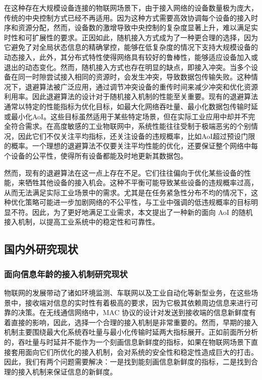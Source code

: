 在这种存在大规模设备连接的物联网场景下，由于接入网络的设备数量极为庞大，传统的中央控制方式已经不再适用\cite{9}。因为这种方式需要高效协调每个设备的接入时序和资源分配，然而，设备数的激增导致中央控制的复杂度显著上升，难以满足实时性和可扩展性的要求\cite{berioli2016modern}。正因如此，随机接入方式成为了一种更合理的选择，因为它避免了对全局状态信息的精确掌控，能够在低复杂度的情况下支持大规模设备的动态接入，此外，其分布式特性使得网络具有较好的鲁棒性，能够适应设备加入或退出的动态变化\cite{12}。然而，随机接入方式也存在明显的缺点，即接入冲突。当多个设备在同一时隙尝试接入相同的资源时，会发生冲突，导致数据包传输失败。这种情况下，退避算法被广泛应用，通过调节冲突设备的重传时间来减少冲突和优化资源利用率\cite{kang2010novel}。因此退避算法的设计对于随机接入机制的性能至关重要。现有的退避算法通常以特定的性能指标为优化目标，如最大化网络吞吐量、最小化数据包传输时延或最小化AoI。这些目标虽然适用于某些特定场景，但在实际工业应用中却并不完全符合需求。在高度敏感的工业物联网中，系统性能往往受制于极端恶劣的个别情况，因此它们不仅关注平均指标，还关注设备的违规概率，比如AoI超过预设门限的概率\cite{13}。一个理想的退避算法不仅要关注平均性能的优化，还要保证整个网络中每个设备的公平性，使得所有设备都能及时地更新其数据包。

然而，现有的退避算法在这一点上存在不足。它们往往偏向于优化某些设备的性能，来牺牲其他设备的接入机会。这种不平衡可能导致某些设备的违规概率过高，从而无法满足实际工业场景中的需求。尤其是在任务紧急性分布不均的情况下，这种优化策略可能进一步加剧网络的不公平性，与工业中强调的低违规概率的目标明显不符\cite{wang2023age}。因此，为了更好地满足工业需求，本文提出了一种新的面向 AoI 的随机接入机制，以提高工业系统中的稳定性和可靠性。

\subsection{国内外研究现状}
\subsubsection{面向信息年龄的接入机制研究现状}
物联网的发展带动了诸如环境监测、车联网以及工业自动化等新型业务，在这些场景中，接收端对信息的实时性有着极高的要求，因为它极其依赖周边信息来进行可靠的决策。在无线通信网络中，MAC 协议的设计对发送到接收端的信息新鲜度有着直接的影响，因此，选择一个合理的接入机制是非常重要的。然而，早期的接入机制主要围绕最大化系统吞吐量与最小化传输时延两大指标展开\cite{rom2012multiple}。正如前面所分析的，吞吐量与时延并不能作为一个刻画信息新鲜度的指标，如果在物联网场景下直接套用面向它们所优化的接入机制，会对系统的安全性和稳定性造成巨大的打击。因此，我们有两个问题需要解决：一是找到能刻画信息新鲜度的指标，二是找到合理的接入机制来保证信息的新鲜度。

